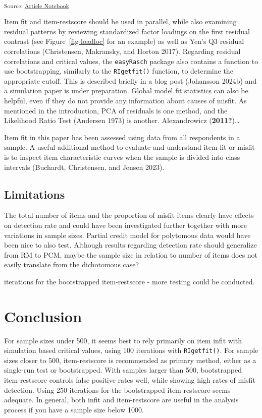 \documentclass[
  letterpaper,
  DIV=11,
  numbers=noendperiod]{scrartcl}
\begin{document}
\textsubscript{Source:
\href{https://pgmj.github.io/rasch_itemfit/index.qmd.html}{Article
Notebook}}

Item fit and item-restscore should be used in parallel, while also
examining residual patterns by reviewing standardized factor loadings on
the first residual contrast (see Figure~\ref{fig-loadloc} for an
example) as well as Yen's Q3 residual correlations (Christensen,
Makransky, and Horton 2017). Regarding residual correlations and
critical values, the \texttt{easyRasch} package also contains a function
to use bootstrapping, similarly to the \texttt{RIgetfit()} function, to
determine the appropriate cutoff. This is described briefly in a blog
post (Johansson 2024b) and a simulation paper is under preparation.
Global model fit statistics can also be helpful, even if they do not
provide any information about causes of misfit. As mentioned in the
introduction, PCA of residuals is one method, and the Likelihood Ratio
Test (Andersen 1973) is another. Alexandrowicz (\textbf{2011?})\ldots{}

Item fit in this paper has been assessed using data from all respondents
in a sample. A useful additional method to evaluate and understand item
fit or misfit is to inspect item characteristic curves when the sample
is divided into class intervals (Buchardt, Christensen, and Jensen
2023).

\subsection{Limitations}\label{limitations}

The total number of items and the proportion of misfit items clearly
have effects on detection rate and could have been investigated further
together with more variations in sample sizes. Partial credit model for
polytomous data would have been nice to also test. Although results
regarding detection rate should generalize from RM to PCM, maybe the
sample size in relation to number of items does not easily translate
from the dichotomous case?

iterations for the bootstrapped item-restscore - more testing could be
conducted.

\section{Conclusion}\label{conclusion}

For sample sizes under 500, it seems best to rely primarily on item
infit with simulation based critical values, using 100 iterations with
\texttt{RIgetfit()}. For sample sizes closer to 500, item-restscore is
recommended as primary method, either as a single-run test or
bootstrapped. With samples larger than 500, bootstrapped item-restscore
controls false positive rates well, while showing high rates of misfit
detection. Using 250 iterations for the bootstrapped item-restscore
seems adequate. In general, both infit and item-restscore are useful in
the analysis process if you have a sample size below 1000.
\end{document}
